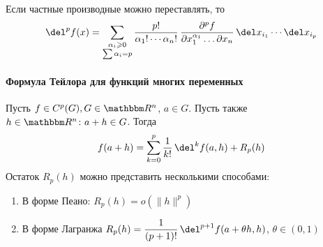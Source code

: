 \documentclass[12pt]{../../../notes}
\begin{document}
\begin{stat}\label{stat:diffspace::highdiff::binom}
  Если частные производные можно переставлять, то
  \[
    \del^p f(x) = \sum_{\substack{\alpha_i \geqslant 0 \\ \sum \alpha_i = p}} 
    \frac{p!}{\alpha_1! \dotsm \alpha_n!} \, 
    \frac{\partial^p f}{\partial x_1^{\alpha_1}\dotso \partial x_n} \,\del x_{i_1} \dotsm \del x_{i_p}
  \]
\end{stat}

\paragraph{Формула Тейлора для функций многих переменных}
\label{par:diffspace::taylor}

\begin{thrm}\label{thrm:diffspace::taylor}
  Пусть $f \in C^p(G), G\in \R^n$, $a\in G$. Пусть также $h\in \R^n \colon a+h \in G$.
  Тогда 
  \[
    f(a+h) = \sum_{k=0}^p \frac{1}{k!} \, \del^k f(a,h) + R_p(h)
  \]
  Остаток $R_p(h)$ можно представить несколькими способами:
  \begin{enumerate}
    \item В форме Пеано: $R_p(h) = o(\|h\|^p)$
    \item В форме Лагранжа $R_p(h) = \dfrac{1}{(p+1)!}\, \del^{p+1} f(a + \theta h, h)$, 
      $\theta \in (0,1)$
  \end{enumerate}


\end{thrm}
\end{document}
